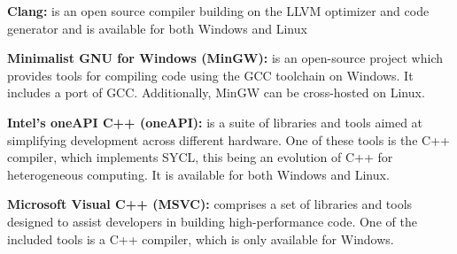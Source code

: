 
\noindent\textbf{Clang:} is an open source compiler building on the LLVM optimizer and code generator and is available for both Windows and Linux\cite{clang}\newline

\noindent\textbf{Minimalist GNU for Windows (MinGW):} is an open-source project which provides tools for compiling code using the GCC toolchain on Windows. It includes a port of GCC. Additionally, MinGW can be cross-hosted on Linux.\cite{mingw}\newline

\noindent\textbf{Intel's oneAPI C++ (oneAPI):} is a suite of libraries and tools aimed at simplifying development across different hardware. One of these tools is the C++ compiler, which implements SYCL, this being an evolution of C++ for heterogeneous computing. It is available for both Windows and Linux.\cite{oneapi}\newline


\noindent\textbf{Microsoft Visual C++ (MSVC):}  comprises a set of libraries and tools designed to assist developers in building high-performance code. One of the included tools is a C++ compiler, which is only available for Windows\cite{msvc}.\newline

